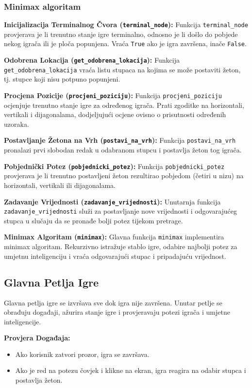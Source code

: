 \documentclass[]{foi}
\begin{document}
\subsubsection{Minimax algoritam}


\textbf{Inicijalizacija Terminalnog Čvora (\texttt{terminal\_node}):}
Funkcija \texttt{terminal\_node} provjerava je li trenutno stanje igre terminalno, odnosno je li došlo do pobjede nekog igrača ili je ploča popunjena. Vraća \texttt{True} ako je igra završena, inače \texttt{False}.

\textbf{Odobrena Lokacija (\texttt{get\_odobrena\_lokacija}):}
Funkcija \texttt{get\_odobrena\_lokacija} vraća listu stupaca na kojima se može postaviti žeton, tj. stupce koji nisu potpuno popunjeni.

\textbf{Procjena Pozicije (\texttt{procjeni\_poziciju}):}
Funkcija \texttt{procjeni\_poziciju} ocjenjuje trenutno stanje igre za određenog igrača. Prati zgoditke na horizontali, vertikali i dijagonalama, dodjeljujući ocjene ovisno o prisutnosti određenih uzoraka.

\textbf{Postavljanje Žetona na Vrh (\texttt{postavi\_na\_vrh}):}
Funkcija \texttt{postavi\_na\_vrh} pronalazi prvi slobodan redak u odabranom stupcu i postavlja žeton tog igrača.

\textbf{Pobjednički Potez (\texttt{pobjednicki\_potez}):}
Funkcija \texttt{pobjednicki\_potez} provjerava je li trenutno postavljeni žeton rezultirao pobjedom (četiri u nizu) na horizontali, vertikali ili dijagonalama.

\textbf{Zadavanje Vrijednosti (\texttt{zadavanje\_vrijednosti}):}
Unutarnja funkcija \texttt{zadavanje\_vrijednosti} služi za postavljanje nove vrijednosti i odgovarajućeg stupca u slučaju da se pronađe bolji potez tijekom pretrage.

\textbf{Minimax Algoritam (\texttt{minimax}):}
Glavna funkcija \texttt{minimax} implementira minimax algoritam. Rekurzivno istražuje stablo igre, odabire najbolji potez za umjetnu inteligenciju i vraća odgovarajući stupac i pripadajuću vrijednost.


\subsection{Glavna Petlja Igre}

Glavna petlja igre se izvršava sve dok igra nije završena. Unutar petlje se obrađuju događaji, ažurira stanje igre i provjeravaju potezi igrača i umjetne inteligencije.

\textbf{Provjera Događaja:}
\begin{itemize}
    \item Ako korisnik zatvori prozor, igra se završava.
    \item Ako je red na potezu čovjek i klikne na ekran, igra reagira na odabir stupca i postavlja žeton.
\end{itemize}
\end{document}
